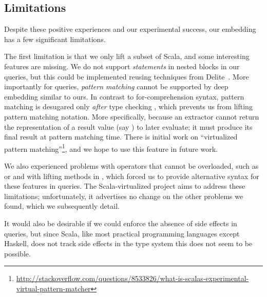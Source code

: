 \subsection{Limitations}
\label{sec:limitations}
Despite these positive experiences and our experimental success, our embedding has a few significant limitations.

The first limitation is that we only lift a subset of Scala, and some interesting features are missing.
We do not support \emph{statements} in nested blocks in our queries, but this could be implemented reusing techniques from Delite~\citep{Rompf11BBlocks}.
More importantly for queries, \emph{pattern matching} cannot be supported by deep embedding similar to ours. In contrast to for-comprehension syntax, pattern matching is desugared only \emph{after} type checking \cite{Emir07Patterns}, which prevents us from lifting pattern matching notation. More specifically, because an extractor \cite{Emir07Patterns} cannot return the representation of a result value (say ) to later evaluate; it must produce its final result at pattern matching time. There is initial work on ``virtualized pattern matching''\footnote{\url{http://stackoverflow.com/questions/8533826/what-is-scalas-experimental-virtual-pattern-matcher}}, and we hope to use this feature in future work.

We also experienced problems with operators that cannot be overloaded, such as \code{==} or  and with lifting methods in , which forced us to provide alternative syntax for these features in queries. The  Scala-virtualized project \citep{Moors12Virtualized} aims to address these limitations; unfortunately, it advertises no change on the other problems we found, which we subsequently detail.


It would also be desirable if we could enforce the absence of side effects in queries, but since Scala, like most practical programming languages except Haskell, does not track side effects in the type system this does not seem to be possible. 

